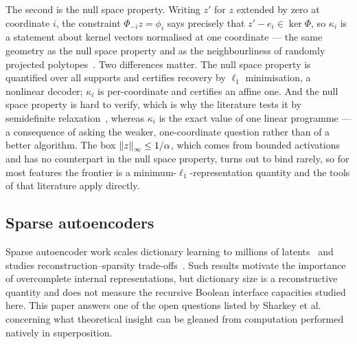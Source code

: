 The second is the null space property. Writing $z'$ for $z$ extended by zero at coordinate $i$,
the constraint $\Phi_{-i}z=\phi_i$ says precisely that $z'-e_i\in\ker\Phi$, so $\kappa_i$ is a
statement about kernel vectors normalised at one coordinate --- the same geometry as the null
space property and as the neighbourliness of randomly projected
polytopes~\cite{donoho2005neighborliness}. Two differences matter. The null space property is
quantified over all supports and certifies recovery by $\ell_1$ minimisation, a nonlinear decoder;
$\kappa_i$ is per-coordinate and certifies an affine one. And the null space property is hard to
verify, which is why the literature tests it by semidefinite
relaxation~\cite{daspremont2011nullspace}, whereas $\kappa_i$ is the exact value of one linear
programme --- a consequence of asking the weaker, one-coordinate question rather than of a better
algorithm. The box $\left\lVert z \right\rVert_\infty\le1/\alpha$, which comes from bounded activations and has no
counterpart in the null space property, turns out to bind rarely, so for most features the
frontier is a minimum-$\ell_1$-representation quantity and the tools of that literature apply
directly.

\subsection{Sparse autoencoders}

Sparse autoencoder work scales dictionary learning to millions of
latents~\cite{cunningham2023sparse,gao2024scaling,lieberum2024gemma} and studies
reconstruction--sparsity trade-offs~\cite{michaud2025manifolds}. Such results motivate the
importance of overcomplete internal representations, but dictionary size is a reconstructive
quantity and does not measure the recursive Boolean interface capacities studied here. This
paper answers one of the open questions listed by Sharkey et al.~\cite{sharkey2025open}
concerning what theoretical insight can be gleaned from computation performed natively in
superposition.

